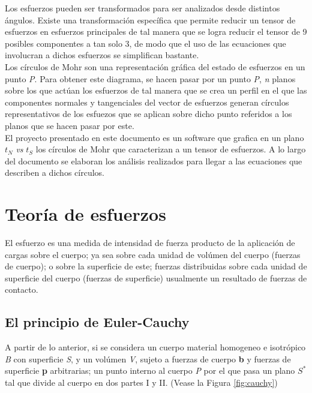 \documentclass{article}
\begin{document}
    Los esfuerzos pueden ser transformados para ser analizados desde distintos ángulos.
    Existe una transformaci\'{o}n específica que permite reducir un tensor de
    esfuerzos en esfuerzos principales de tal manera que se logra reducir el tensor de 9 
    posibles componentes a tan solo 3, de modo que el uso de las ecuaciones que involucran
    a dichos esfuerzos se simplifican bastante.\\
    
    Los círculos de Mohr son una representación gráfica del estado de esfuerzos en un punto 
    \textit{P}. Para obtener este diagrama, se hacen pasar por un punto \textit{P}, 
    \textit{n} planos \bm{$\eta$} sobre los que actúan los esfuerzos de tal manera que se 
    crea un perfil en el que las componentes normales y tangenciales del vector de esfuerzos 
     generan círculos representativos de los esfuezos que se aplican sobre 
    dicho punto referidos a los planos \bm{$\eta$} que se hacen pasar por este.\\

    El proyecto presentado en este documento es un software que grafica en un plano
    ${t}_{N}$ \textit{vs} ${t}_{S}$ los círculos de Mohr que caracterizan a un tensor 
    de esfuerzos. A lo largo del documento se elaboran los análisis realizados para llegar 
    a las ecuaciones que describen a dichos círculos.

    \section{Teor\'{i}a de esfuerzos}

    El esfuerzo es una medida de intensidad de fuerza producto de la aplicación de cargas
    sobre el cuerpo; ya sea sobre cada unidad de volúmen del cuerpo (fuerzas de cuerpo);
    o sobre la superficie de este; fuerzas distribuidas sobre cada unidad de superficie
    del cuerpo (fuerzas de superficie) usualmente un resultado de fuerzas de contacto.

    \subsection{El principio de Euler-Cauchy}

    A partir de lo anterior, si se considera un cuerpo material homogeneo e isotrópico
    \textit{B} con superficie \textit{S}, y un volúmen \textit{V}, sujeto a fuerzas de
    cuerpo \textbf{b} y fuerzas de superficie \textbf{p} arbitrarias; un punto interno 
    al cuerpo \textit{P} por el que pasa un plano $S^{*}$ tal que divide al cuerpo
    en dos partes I y II. (Vease la Figura \ref{fig:cauchy})
\end{document}
